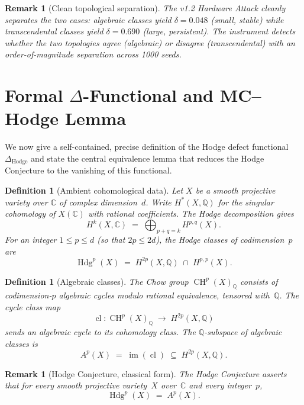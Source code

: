 \documentclass[11pt]{article}
\newtheorem{definition}[theorem]{Definition}
\newtheorem{remark}[theorem]{Remark}
\theoremstyle{definition}
\DeclareMathOperator{\cl}{cl}
\DeclareMathOperator{\CH}{CH}
\DeclareMathOperator{\im}{im}
\DeclareMathOperator{\Hdg}{Hdg}
\begin{document}
\begin{remark}[Clean topological separation]
The v1.2 Hardware Attack cleanly separates the two cases:
algebraic classes yield $\delta = 0.048$ (small, stable) while
transcendental classes yield $\delta = 0.690$ (large, persistent).
The instrument detects whether the two topologies agree (algebraic)
or disagree (transcendental) with an order-of-magnitude separation
across 1000 seeds.
\end{remark}

\section{Formal $\Delta$-Functional and MC--Hodge Lemma}
\label{sec:delta-functional}

We now give a self-contained, precise definition of the Hodge defect
functional $\Delta_{\mathrm{Hodge}}$ and state the central equivalence
lemma that reduces the Hodge Conjecture to the vanishing of this
functional.


\begin{definition}[Ambient cohomological data]
\label{def:ambient}
Let $X$ be a smooth projective variety over $\mathbb{C}$ of complex
dimension~$d$.  Write $H^{*}(X,\mathbb{Q})$ for the singular
cohomology of $X(\mathbb{C})$ with rational coefficients.  The Hodge
decomposition gives
\[
  H^{k}(X,\mathbb{C})
  \;=\;
  \bigoplus_{p+q=k} H^{p,q}(X).
\]
For an integer $1\le p\le d$ (so that $2p\le 2d$), the
\emph{Hodge classes of codimension~$p$} are
\[
  \Hdg^{p}(X)
  \;=\;
  H^{2p}(X,\mathbb{Q})\;\cap\; H^{p,p}(X).
\]
\end{definition}

\begin{definition}[Algebraic classes]
\label{def:algebraic}
The \emph{Chow group} $\CH^{p}(X)_{\mathbb{Q}}$ consists of
codimension-$p$ algebraic cycles modulo rational equivalence, tensored
with~$\mathbb{Q}$.  The \emph{cycle class map}
\[
  \cl \colon \CH^{p}(X)_{\mathbb{Q}}
  \;\longrightarrow\;
  H^{2p}(X,\mathbb{Q})
\]
sends an algebraic cycle to its cohomology class.  The
$\mathbb{Q}$-subspace of \emph{algebraic classes} is
\[
  A^{p}(X) \;=\; \im(\cl)
  \;\subseteq\; H^{2p}(X,\mathbb{Q}).
\]
\end{definition}

\begin{remark}[Hodge Conjecture, classical form]
\label{rem:hodge-classical}
The Hodge Conjecture asserts that for every smooth projective
variety~$X$ over~$\mathbb{C}$ and every integer~$p$,
\[
  \Hdg^{p}(X) \;=\; A^{p}(X).
\]
\end{remark}
\end{document}
